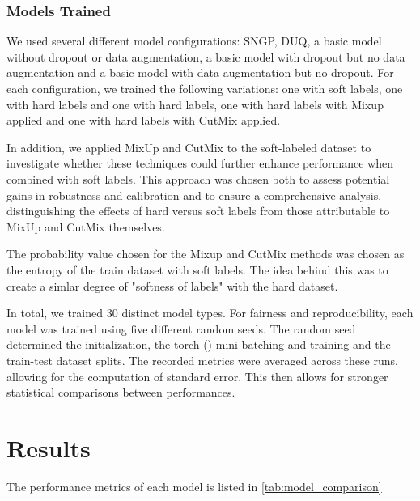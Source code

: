 \documentclass{article}
\begin{document}
\subsubsection*{Models Trained}
We used several different model configurations: SNGP, DUQ, a basic model without dropout or data augmentation, a basic model with dropout but no data augmentation and a basic model with data augmentation but no dropout. For each configuration, we trained the following variations: one with soft labels, one with hard labels and one with hard labels, one with hard labels with Mixup applied and one with hard labels with CutMix applied.

In addition, we applied MixUp and CutMix to the soft-labeled dataset to investigate whether these techniques could further enhance performance when combined with soft labels. This approach was chosen both to assess potential gains in robustness and calibration and to ensure a comprehensive analysis, distinguishing the effects of hard versus soft labels from those attributable to MixUp and CutMix themselves.

The probability value chosen for the Mixup and CutMix methods was chosen as the entropy of the train dataset with soft labels. The idea behind this was to create a simlar degree of "softness of labels" with the hard dataset.

In total, we trained $30$ distinct model types. For fairness and reproducibility, each model was trained using five different random seeds. The random seed determined the initialization, the torch (\cite{NEURIPS2019_9015}) mini-batching and training and the train-test dataset splits. The recorded metrics were averaged across these runs, allowing for the computation of standard error. This then allows for stronger statistical comparisons between performances.
\section{Results}
The performance metrics of each model is listed in \autoref{tab:model_comparison}
\end{document}
